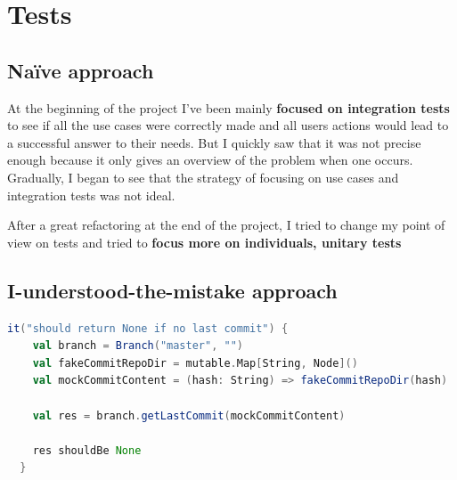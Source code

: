 \documentclass[11pt]{article}
\begin{document}

\section{Tests}
\subsection{Naïve approach}
At the beginning of the project I've been mainly \textbf{focused on integration tests} to see if all the use cases were correctly made and all users actions would lead to a successful answer to their needs. But I quickly saw that it was not precise enough because it only gives an overview of the problem when one occurs. Gradually, I began to see that the strategy of focusing on use cases and integration tests was not ideal.

After a great refactoring at the end of the project, I tried to change my point of view on tests and tried to \textbf{focus more on individuals, unitary tests}




\subsection{I-understood-the-mistake approach}


\begin{lstlisting}[language=scala]
  it("should return None if no last commit") {
    val branch = Branch("master", "")
    val fakeCommitRepoDir = mutable.Map[String, Node]()
    val mockCommitContent = (hash: String) => fakeCommitRepoDir(hash)

    val res = branch.getLastCommit(mockCommitContent)

    res shouldBe None
  }
\end{lstlisting}
\end{document}
